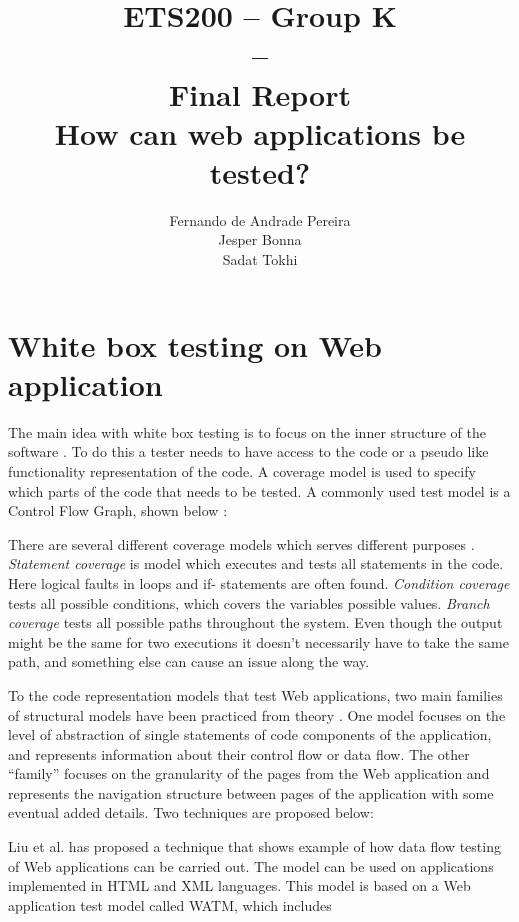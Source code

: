 \documentclass[a4paper]{article}
\title{ETS200 -- Group K\\--\\ Final Report \\
How can web applications be tested?
}
\author{Fernando de Andrade Pereira
\\Jesper Bonna
\\Sadat Tokhi
}
\begin{document}
\maketitle
\thispagestyle{empty}
\clearpage

\tableofcontents
\thispagestyle{empty}
\clearpage

\setcounter{page}{1}

\section{White box testing on Web application}
The main idea with white box testing is to focus on the inner structure of the software \cite{ib03}. To do this
a tester needs to have access to the code or a pseudo like functionality representation of the code. A
coverage model is used to specify which parts of the code that needs to be tested. A commonly used
test model is a Control Flow Graph, shown below \cite{p91}:

There are several different coverage models which serves different purposes \cite{ib03}. \emph{Statement coverage}
is model which executes and tests all statements in the code. Here logical faults in loops and if-
statements are often found. \emph{Condition coverage} tests all possible conditions, which covers the
variables possible values. \emph{Branch coverage} tests all possible paths throughout the system. Even
though the output might be the same for two executions it doesn’t necessarily have to take the same
path, and something else can cause an issue along the way.

To the code representation models that test Web applications, two main families of structural
models have been practiced from theory \cite{dlf06}. One model focuses on the level of abstraction of
single statements of code components of the application, and represents information about their
control flow or data flow. The other “family” focuses on the granularity of the pages from the Web
application and represents the navigation structure between pages of the application with some
eventual added details. Two techniques are proposed below:

Liu et al.\cite{lkhh01} has proposed a technique that shows example of how data flow testing of Web
applications can be carried out. The model can be used on applications implemented in HTML and
XML languages. This model is based on a Web application test model called WATM, which includes
\end{document}
